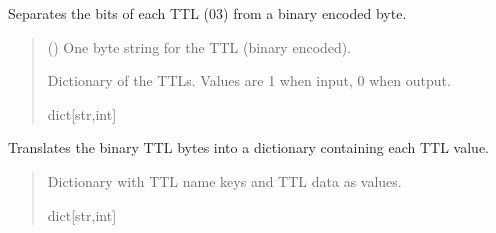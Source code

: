 \documentclass[letterpaper,10pt,english]{sphinxmanual}
\begin{document}
\begin{fulllineitems}

\begin{fulllineitems}
\label{\detokenize{PodApi.Packets:PodApi.Packets.Binary4.PacketBinary4.TranslateBinaryTTLbyte}}
\pysigstartsignatures
{}
\pysigstopsignatures
\sphinxAtStartPar
Separates the bits of each TTL (0\sphinxhyphen{}3) from a binary encoded byte.
\begin{quote}\begin{description}
\sphinxAtStartPar
{} () \textendash{} One byte string for the TTL (binary encoded).

\sphinxAtStartPar
Dictionary of the TTLs. Values are 1 when input, 0 when output.

\sphinxAtStartPar
dict{[}str,int{]}

\end{description}\end{quote}

\end{fulllineitems}


\begin{fulllineitems}
\label{\detokenize{PodApi.Packets:PodApi.Packets.Binary4.PacketBinary4.Ttl}}
\pysigstartsignatures
{}
\pysigstopsignatures
\sphinxAtStartPar
Translates the binary TTL bytes into a dictionary containing each TTL value.
\begin{quote}\begin{description}
\sphinxAtStartPar
Dictionary with TTL name keys and TTL data as values.

\sphinxAtStartPar
dict{[}str,int{]}


\end{description}
\end{quote}
\end{fulllineitems}
\end{fulllineitems}
\end{document}
